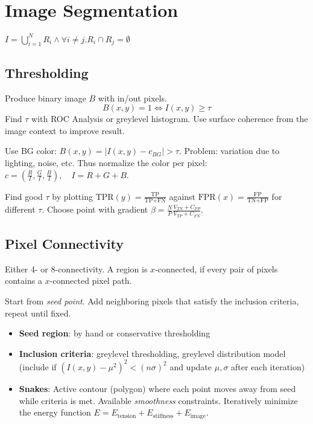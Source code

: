 \section{Image Segmentation}
\begin{definition}
  \(I = \bigcup_{i=1}^N R_i \land \forall i \neq j. R_i \cap R_j = \emptyset\)
\end{definition}

\subsection{Thresholding}

\begin{algorithm}[Thresholding]
  Produce binary image \(B\) with in/out pixels.
  \[B(x, y) = 1  \iff I(x, y) \geq \tau\]
  Find \(\tau\) with ROC Analysis or greylevel histogram. Use surface coherence from the image context to improve result.
\end{algorithm}

\begin{algorithm}[Chromakeying]
  Use BG color: \(B(x, y) = |I(x, y) - c_{BG}| > \tau\).
  Problem: variation due to lighting, noise, etc.
  Thus normalize the color per pixel: \(c = (\frac{R}{I}, \frac{G}{I}, \frac{B}{I}), \quad I = R + G + B\).
\end{algorithm}

\begin{definition}
  Find good \(\tau\) by plotting \(\text{TPR} (y) = \frac{\text{TP}}{\text{TP} + \text{FN}}\) against \(\text{FPR}(x) = \frac{\text{FP}}{\text{TN} + \text{FP}}\) for different \(\tau\). 
  Choose point with gradient \(\beta = \frac{N}{P} \frac{V_{TN} + C_{FP}}{V_{TP} + C_{FN}}\).
\end{definition}

\subsection{Pixel Connectivity}
Either 4- or 8-connectivity. A region is \(x\)-connected, if every pair of pixels contains a \(x\)-connected pixel path.

\begin{algorithm}
  Start from \textit{seed point}. Add neighboring pixels that satisfy the inclusion criteria, repeat until fixed.

  \begin{itemize}
    \item \textbf{Seed region}: by hand or conservative thresholding
    \item \textbf{Inclusion criteria}: greylevel thresholding, greylevel distribution model (include if \((I(x, y) - \mu^2)^2 < (n \sigma)^2\) and update \(\mu, \sigma\) after each iteration)
    \item \textbf{Snakes}: Active contour (polygon) where each point moves away from seed while criteria is met.
    Available \textit{smoothness} constraints.
    Iteratively minimize the energy function \(E = E_{\text{tension}} + E_{\text{stiffness}} + E_{\text{image}}\).
  \end{itemize}
\end{algorithm}

